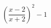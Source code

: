 \begin{ex}[type=expression]
	\begin{condition}
		\(\left( \dfrac{x-2}{x+2} \right)^2-1\)
	\end{condition}
\end{ex}